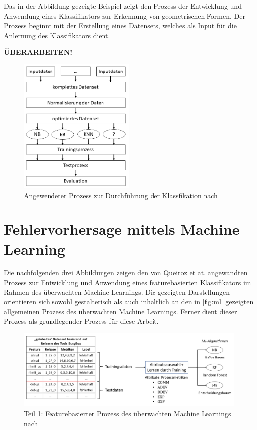 Das in der Abbildung gezeigte Beispiel zeigt den Prozess der Entwicklung und Anwendung eines Klassifikators zur Erkennung von geometrischen Formen.
Der Prozess beginnt mit der Erstellung eines Datensets, welches als Input für die Anlernung des Klassifikators dient.

\textbf{ÜBERARBEITEN!}

\begin{figure}[H]
    \centering
    \includegraphics[width=0.5\textwidth]{images/Prozess}
    \caption{Angewendeter Prozess zur Durchführung der Klassfikation nach \cite{Ceylan2006}}\label{fig:process}
\end{figure}

\section{Fehlervorhersage mittels Machine Learning}

Die nachfolgenden drei Abbildungen zeigen den von Queiroz et at. \cite{Queiroz2016} angewandten Prozess zur Entwicklung und Anwendung eines featurebasierten Klassifikators im Rahmen des überwachten Machine Learnings. Die gezeigten Darstellungen orientieren sich sowohl gestalterisch als auch inhaltlich an den in \autoref{fig:ml} gezeigten allgemeinen Prozess des überwachten Machine Learnings. Ferner dient dieser Prozess als grundlegender Prozess für diese Arbeit.

\begin{figure}[H]
    \centering
    \captionsetup{justification=centering}
    \includegraphics[width=\textwidth]{images/ML1}
    \caption{Teil 1: Featurebasierter Prozess des überwachten Machine Learnings nach \cite{Queiroz2016}}\label{fig:ml1}
\end{figure}

